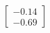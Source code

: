 \documentclass[preview]{standalone}
\begin{document}
\begin{align*}
\begin{bmatrix} -0.14 \\ -0.69 \end{bmatrix}
\end{align*}
\end{document}
